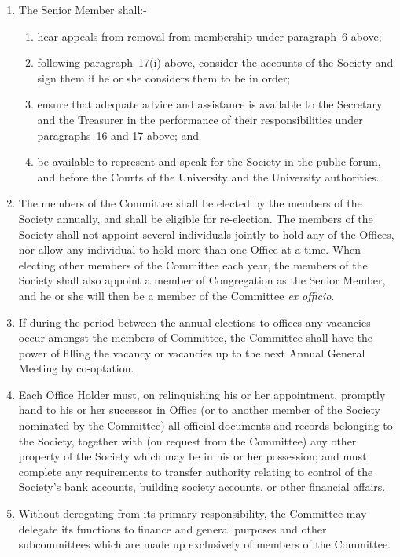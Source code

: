 \documentclass[11pt]{article}
\begin{document}
\begin{enumerate}
\begin{enumerate}
\end{enumerate}
\item The Senior Member shall:-
\begin{enumerate}
\item hear appeals from removal from membership under paragraph~6 above;
\item following paragraph~17(i) above, consider the accounts of the Society and sign them if he or she considers them to be in order;
\item ensure that adequate advice and assistance is available to the Secretary and the Treasurer in the performance of their responsibilities under paragraphs~16 and 17 above; and
\item be available to represent and speak for the Society in the public forum, and before the Courts of the University and the University authorities.
\end{enumerate}
\item The members of the Committee shall be elected by the members of the Society annually, and shall be eligible for re-election. The members of the Society shall not appoint several individuals jointly to hold any of the Offices, nor allow any individual to hold more than one Office at a time. When electing other members of the Committee each year, the members of the Society shall also appoint a member of Congregation as the Senior Member, and he or she will then be a member of the Committee \emph{ex officio}.
\item If during the period between the annual elections to offices any vacancies occur amongst the members of Committee, the Committee shall have the power of filling the vacancy or vacancies up to the next Annual General Meeting by co-optation.
\item Each Office Holder must, on relinquishing his or her appointment, promptly hand to his or her successor in Office (or to another member of the Society nominated by the Committee) all official documents and records belonging to the Society, together with (on request from the Committee) any other property of the Society which may be in his or her possession; and must complete any requirements to transfer authority relating to control of the Society's bank accounts, building society accounts, or other financial affairs.
\item Without derogating from its primary responsibility, the Committee may delegate its functions to finance and general purposes and other subcommittees which are made up exclusively of members of the Committee.

\end{enumerate}
\end{document}
